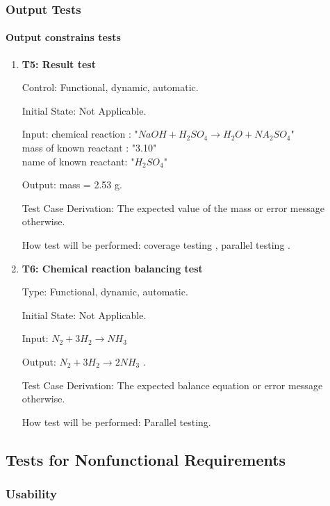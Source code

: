 \documentclass[12pt, titlepage]{article}
\begin{document}
\subsubsection{Output Tests}

\paragraph{Output constrains tests}

\begin{enumerate}

\item{\bf T5: Result test\\}

Control:  Functional, dynamic, automatic.
					
Initial State: Not Applicable.
					
Input: chemical reaction : "$NaOH + H_2SO_4 \rightarrow H_2O + NA_2SO_4$"\\
mass of known reactant : "3.10"\\
name  of known reactant: "$H_2SO_4$"
				
Output: mass = 2.53 g.

Test Case Derivation: The expected value of the mass  or error message otherwise.
					
How test will be performed: coverage testing , parallel testing .

\item{\bf T6: Chemical reaction balancing test\\}

Type: Functional, dynamic, automatic.
					
Initial State: Not Applicable.
					
Input: $ N_2 + 3H_2 \rightarrow NH_3 $ 
					
Output: $ N_2 + 3H_2 \rightarrow 2NH_3 $ .

Test Case Derivation: The expected balance equation or error message otherwise.

How test will be performed: Parallel testing.

\end{enumerate}

\subsection{Tests for Nonfunctional Requirements}


\subsubsection{Usability}
		
\end{document}
